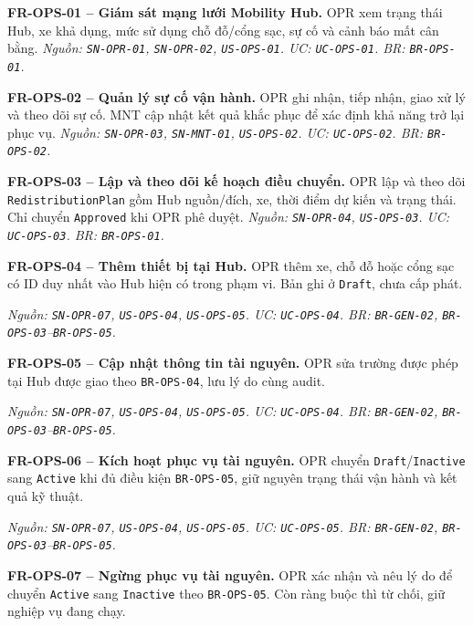 \noindent\textbf{FR-OPS-01 -- Giám sát mạng lưới Mobility Hub.} OPR xem trạng thái Hub, xe khả dụng, mức sử dụng chỗ đỗ/cổng sạc, sự cố và cảnh báo mất cân bằng.
\textit{Nguồn: \texttt{SN-OPR-01}, \texttt{SN-OPR-02}, \texttt{US-OPS-01}. UC: \texttt{UC-OPS-01}. BR: \texttt{BR-OPS-01}.}

\medskip
\noindent\textbf{FR-OPS-02 -- Quản lý sự cố vận hành.} OPR ghi nhận, tiếp nhận, giao xử lý và theo dõi sự cố. MNT cập nhật kết quả khắc phục để xác định khả năng trở lại phục vụ.
\textit{Nguồn: \texttt{SN-OPR-03}, \texttt{SN-MNT-01}, \texttt{US-OPS-02}. UC: \texttt{UC-OPS-02}. BR: \texttt{BR-OPS-02}.}

\medskip
\noindent\textbf{FR-OPS-03 -- Lập và theo dõi kế hoạch điều chuyển.} OPR lập và theo dõi \texttt{RedistributionPlan} gồm Hub nguồn/đích, xe, thời điểm dự kiến và trạng thái. Chỉ chuyển \texttt{Approved} khi OPR phê duyệt.
\textit{Nguồn: \texttt{SN-OPR-04}, \texttt{US-OPS-03}. UC: \texttt{UC-OPS-03}. BR: \texttt{BR-OPS-01}.}

\medskip
\noindent\textbf{FR-OPS-04 -- Thêm thiết bị tại Hub.} OPR thêm xe, chỗ đỗ hoặc cổng sạc có ID duy nhất vào Hub hiện có trong phạm vi. Bản ghi ở \texttt{Draft}, chưa cấp phát.

\textit{Nguồn: \texttt{SN-OPR-07}, \texttt{US-OPS-04}, \texttt{US-OPS-05}. UC: \texttt{UC-OPS-04}. BR: \texttt{BR-GEN-02}, \texttt{BR-OPS-03}--\texttt{BR-OPS-05}.}

\medskip
\noindent\textbf{FR-OPS-05 -- Cập nhật thông tin tài nguyên.} OPR sửa trường được phép tại Hub được giao theo \texttt{BR-OPS-04}, lưu lý do cùng audit.

\textit{Nguồn: \texttt{SN-OPR-07}, \texttt{US-OPS-04}, \texttt{US-OPS-05}. UC: \texttt{UC-OPS-04}. BR: \texttt{BR-GEN-02}, \texttt{BR-OPS-03}--\texttt{BR-OPS-05}.}

\medskip
\noindent\textbf{FR-OPS-06 -- Kích hoạt phục vụ tài nguyên.} OPR chuyển \texttt{Draft}/\texttt{Inactive} sang \texttt{Active} khi đủ điều kiện \texttt{BR-OPS-05}, giữ nguyên trạng thái vận hành và kết quả kỹ thuật.

\textit{Nguồn: \texttt{SN-OPR-07}, \texttt{US-OPS-04}, \texttt{US-OPS-05}. UC: \texttt{UC-OPS-05}. BR: \texttt{BR-GEN-02}, \texttt{BR-OPS-03}--\texttt{BR-OPS-05}.}

\medskip
\noindent\textbf{FR-OPS-07 -- Ngừng phục vụ tài nguyên.} OPR xác nhận và nêu lý do để chuyển \texttt{Active} sang \texttt{Inactive} theo \texttt{BR-OPS-05}. Còn ràng buộc thì từ chối, giữ nghiệp vụ đang chạy.

